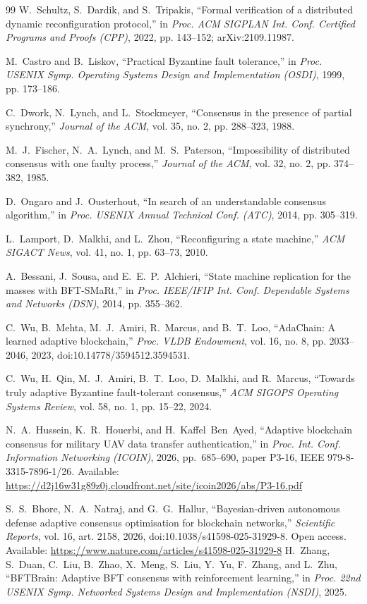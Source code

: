\documentclass[journal]{IEEEtran}
\theoremstyle{definition}
\theoremstyle{remark}
\begin{document}
\begin{thebibliography}{99}
 W.~Schultz, S.~Dardik, and S.~Tripakis, ``Formal verification of a
distributed dynamic reconfiguration protocol,'' in \emph{Proc. ACM SIGPLAN Int. Conf. Certified
Programs and Proofs (CPP)}, 2022, pp. 143--152; arXiv:2109.11987.

 M.~Castro and B.~Liskov, ``Practical Byzantine fault tolerance,'' in \emph{Proc.
USENIX Symp. Operating Systems Design and Implementation (OSDI)}, 1999, pp. 173--186.

 C.~Dwork, N.~Lynch, and L.~Stockmeyer, ``Consensus in the presence of partial
synchrony,'' \emph{Journal of the ACM}, vol. 35, no. 2, pp. 288--323, 1988.

 M.~J.~Fischer, N.~A.~Lynch, and M.~S.~Paterson, ``Impossibility of distributed
consensus with one faulty process,'' \emph{Journal of the ACM}, vol. 32, no. 2, pp. 374--382,
1985.

 D.~Ongaro and J.~Ousterhout, ``In search of an understandable consensus
algorithm,'' in \emph{Proc. USENIX Annual Technical Conf. (ATC)}, 2014, pp. 305--319.

 L.~Lamport, D.~Malkhi, and L.~Zhou, ``Reconfiguring a state machine,''
\emph{ACM SIGACT News}, vol. 41, no. 1, pp. 63--73, 2010.

 A.~Bessani, J.~Sousa, and E.~E.~P.~Alchieri, ``State machine replication for
the masses with BFT-SMaRt,'' in \emph{Proc. IEEE/IFIP Int. Conf. Dependable Systems and Networks
(DSN)}, 2014, pp. 355--362.

 C.~Wu, B.~Mehta, M.~J.~Amiri, R.~Marcus, and B.~T.~Loo, ``AdaChain: A learned
adaptive blockchain,'' \emph{Proc. VLDB Endowment}, vol. 16, no. 8, pp. 2033--2046, 2023,
doi:10.14778/3594512.3594531.

 C.~Wu, H.~Qin, M.~J.~Amiri, B.~T.~Loo, D.~Malkhi, and R.~Marcus, ``Towards truly
adaptive Byzantine fault-tolerant consensus,'' \emph{ACM SIGOPS Operating Systems Review}, vol. 58,
no. 1, pp. 15--22, 2024.

 N.~A.~Hussein, K.~R.~Houerbi, and H.~Kaffel~Ben~Ayed, ``Adaptive blockchain
consensus for military UAV data transfer authentication,'' in \emph{Proc. Int. Conf. Information
Networking (ICOIN)}, 2026, pp.~685--690, paper P3-16, IEEE 979-8-3315-7896-1/26. Available:
\url{https://d2j16w31g89z0j.cloudfront.net/site/icoin2026/abs/P3-16.pdf}

 S.~S.~Bhore, N.~A.~Natraj, and G.~G.~Hallur, ``Bayesian-driven autonomous defense
adaptive consensus optimisation for blockchain networks,'' \emph{Scientific Reports}, vol. 16,
art. 2158, 2026, doi:10.1038/s41598-025-31929-8. Open access. Available:
\url{https://www.nature.com/articles/s41598-025-31929-8}
 H.~Zhang, S.~Duan, C.~Liu, B.~Zhao, X.~Meng, S.~Liu, Y.~Yu, F.~Zhang, and
L.~Zhu, ``BFTBrain: Adaptive BFT consensus with reinforcement learning,'' in \emph{Proc. 22nd
USENIX Symp. Networked Systems Design and Implementation (NSDI)}, 2025.


\end{thebibliography}
\end{document}
